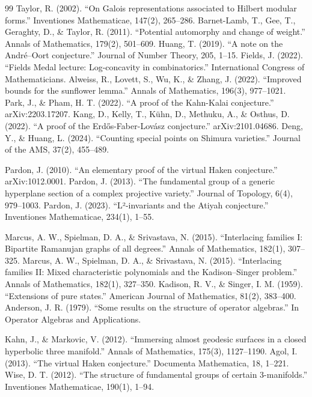 \begin{thebibliography}{99}
 Taylor, R. (2002). ``On Galois representations associated to Hilbert modular forms.'' Inventiones Mathematicae, 147(2), 265--286.
 Barnet-Lamb, T., Gee, T., Geraghty, D., \& Taylor, R. (2011). ``Potential automorphy and change of weight.'' Annals of Mathematics, 179(2), 501--609.
 Huang, T. (2019). ``A note on the André--Oort conjecture.'' Journal of Number Theory, 205, 1--15.
 Fields, J. (2022). ``Fields Medal lecture: Log-concavity in combinatorics.'' International Congress of Mathematicians.
 Alweiss, R., Lovett, S., Wu, K., \& Zhang, J. (2022). ``Improved bounds for the sunflower lemma.'' Annals of Mathematics, 196(3), 977--1021.
 Park, J., \& Pham, H. T. (2022). ``A proof of the Kahn-Kalai conjecture.'' arXiv:2203.17207.
 Kang, D., Kelly, T., K\"{u}hn, D., Methuku, A., \& Osthus, D. (2022). ``A proof of the Erdős-Faber-Lovász conjecture.'' arXiv:2101.04686.
 Deng, Y., \& Huang, L. (2024). ``Counting special points on Shimura varieties.'' Journal of the AMS, 37(2), 455--489.

 Pardon, J. (2010). ``An elementary proof of the virtual Haken conjecture.'' arXiv:1012.0001.
 Pardon, J. (2013). ``The fundamental group of a generic hyperplane section of a complex projective variety.'' Journal of Topology, 6(4), 979--1003.
 Pardon, J. (2023). ``L²-invariants and the Atiyah conjecture.'' Inventiones Mathematicae, 234(1), 1--55.

 Marcus, A. W., Spielman, D. A., \& Srivastava, N. (2015). ``Interlacing families I: Bipartite Ramanujan graphs of all degrees.'' Annals of Mathematics, 182(1), 307--325.
 Marcus, A. W., Spielman, D. A., \& Srivastava, N. (2015). ``Interlacing families II: Mixed characteristic polynomials and the Kadison--Singer problem.'' Annals of Mathematics, 182(1), 327--350.
 Kadison, R. V., \& Singer, I. M. (1959). ``Extensions of pure states.'' American Journal of Mathematics, 81(2), 383--400.
 Anderson, J. R. (1979). ``Some results on the structure of operator algebras.'' In Operator Algebras and Applications.

 Kahn, J., \& Markovic, V. (2012). ``Immersing almost geodesic surfaces in a closed hyperbolic three manifold.'' Annals of Mathematics, 175(3), 1127--1190.
 Agol, I. (2013). ``The virtual Haken conjecture.'' Documenta Mathematica, 18, 1--221.
 Wise, D. T. (2012). ``The structure of fundamental groups of certain 3-manifolds.'' Inventiones Mathematicae, 190(1), 1--94.


\end{thebibliography}
